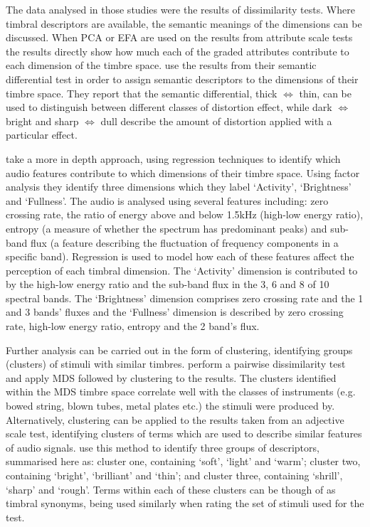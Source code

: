		The data analysed in those studies were the results of dissimilarity tests. Where timbral descriptors are
		available, the semantic meanings of the dimensions can be discussed. When PCA or EFA are used on the
		results from attribute scale tests the results directly show how much each of the graded attributes
		contribute to each dimension of the timbre space. \citet{marui2005timbre} use the results from their
		semantic differential test in order to assign semantic descriptors to the dimensions of their timbre space.
		They report that the semantic differential, thick $\Leftrightarrow$ thin, can be used to distinguish
		between different classes of distortion effect, while dark $\Leftrightarrow$ bright and sharp
		$\Leftrightarrow$ dull describe the amount of distortion applied with a particular effect.

		\citet{alluri2010exploring} take a more in depth approach, using regression techniques to identify which
		audio features contribute to which dimensions of their timbre space. Using factor analysis they identify
		three dimensions which they label `Activity', `Brightness' and `Fullness'. The audio is analysed using
		several features including: zero crossing rate, the ratio of energy above and below 1.5kHz (high-low energy
		ratio), entropy (a measure of whether the spectrum has predominant peaks) and sub-band flux (a feature
		describing the fluctuation of frequency components in a specific band). Regression is used to model how
		each of these features affect the perception of each timbral dimension. The `Activity' dimension is
		contributed to by the high-low energy ratio and the sub-band flux in the 3, 6 and
		8 of 10 spectral bands. The `Brightness' dimension comprises zero crossing rate and the
		1 and 3 bands' fluxes and the `Fullness' dimension is described by zero crossing rate,
		high-low energy ratio, entropy and the 2 band's flux.

		Further analysis can be carried out in the form of clustering, identifying groups (clusters) of stimuli
		with similar timbres. \citet{lakatos2000a} perform a pairwise dissimilarity test and apply MDS followed by
		clustering to the results. The clusters identified within the MDS timbre space correlate well with the
		classes of instruments (e.g. bowed string, blown tubes, metal plates etc.) the stimuli were produced by.
		Alternatively, clustering can be applied to the results taken from an adjective scale test, identifying
		clusters of terms which are used to describe similar features of audio signals. \citet{zacharakis2011an2}
		use this method to identify three groups of descriptors, summarised here as: cluster one, containing
		`soft', `light' and `warm'; cluster two, containing `bright', `brilliant' and `thin'; and cluster three,
		containing `shrill', `sharp' and `rough'. Terms within each of these clusters can be though of as timbral
		synonyms, being used similarly when rating the set of stimuli used for the test.

